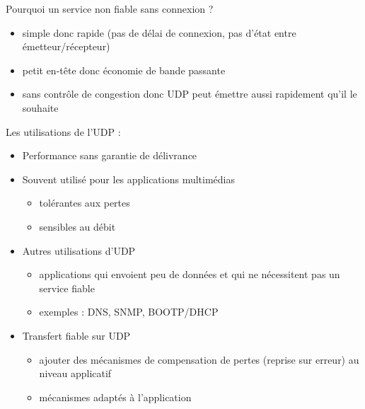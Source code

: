 \documentclass[journal, a4paper]{IEEEtran}
\begin{document}
	Pourquoi un service non fiable sans connexion ?
	
	\begin{itemize}
		\item simple donc rapide (pas de délai de connexion, pas d’état
entre émetteur/récepteur)
		\item petit en-tête donc économie de bande passante
		\item sans contrôle de congestion donc UDP peut émettre aussi
rapidement qu’il le souhaite
	\end{itemize}
	
	Les utilisations de l'UDP :
	
	\begin{itemize}
		\item Performance sans garantie de délivrance
		\item Souvent utilisé pour les applications multimédias
		\begin{itemize}
			\item tolérantes aux pertes
			\item sensibles au débit
		\end{itemize}
		\item Autres utilisations d’UDP
		\begin{itemize}
			\item applications qui envoient peu de données et qui ne nécessitent
pas un service fiable
			\item exemples : DNS, SNMP, BOOTP/DHCP
		\end{itemize}
		\item Transfert fiable sur UDP
		\begin{itemize}
			\item ajouter des mécanismes de compensation de pertes (reprise
sur erreur) au niveau applicatif
			\item mécanismes adaptés à l’application
		\end{itemize}
	\end{itemize}
	
	
\end{document}
